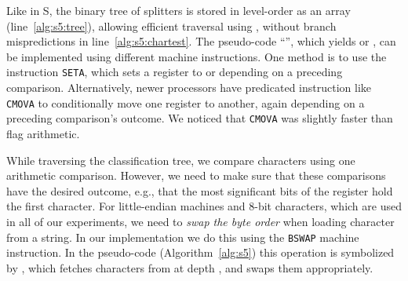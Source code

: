 \documentclass[a4paper]{myjournal}
\begin{document}
Like in S, the binary tree of splitters is stored in level-order as an array
 (line~\ref{alg:s5:tree}), allowing efficient traversal using , without branch mispredictions in line~\ref{alg:s5:chartest}. The
pseudo-code ``'', which yields  or , can be implemented
using different machine instructions. One method is to use the instruction
\texttt{SETA}, which sets a register to  or  depending on a preceding
comparison. Alternatively, newer processors have predicated instruction like
\texttt{CMOVA} to conditionally move one register to another, again depending on
a preceding comparison's outcome. We noticed that \texttt{CMOVA} was slightly
faster than flag arithmetic.

While traversing the classification tree, we compare  characters using one
arithmetic comparison. However, we need to make sure that these comparisons
have the desired outcome, e.g., that the most significant bits of the register
hold the first character. For little-endian machines and 8-bit characters, which
are used in all of our experiments, we need to \emph{swap the byte order} when
loading character from a string. In our implementation we do this using the
\texttt{BSWAP} machine instruction. In the pseudo-code (Algorithm~\ref{alg:s5})
this operation is symbolized by , which fetches 
characters from  at depth , and swaps them appropriately.
\end{document}
